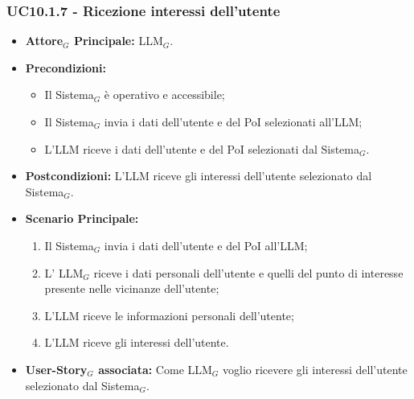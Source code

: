 \documentclass[10pt]{article}
\begin{document}
\begin{justify}
\subsubsection{\textbf{UC10.1.7 - Ricezione interessi dell'utente}}
\begin{itemize}
    \item \textbf{Attore$_G$ Principale:} LLM$_G$.
    \item \textbf{Precondizioni:} 
        \begin{itemize}
          \item Il Sistema$_G$ è operativo e accessibile;
          \item Il Sistema$_G$ invia i dati dell'utente e del PoI selezionati all'LLM;
            \item L'LLM riceve i dati dell'utente e del PoI selezionati dal Sistema$_G$.
        \end{itemize}
      \item \textbf{Postcondizioni:} L'LLM riceve gli interessi dell'utente selezionato dal Sistema$_G$.
    \item \textbf{Scenario Principale:} 
        \begin{enumerate}
          \item Il Sistema$_G$ invia i dati dell'utente e del PoI all'LLM;
        \item L' LLM$_G$ riceve i dati personali dell'utente e quelli del punto di interesse presente nelle vicinanze dell'utente;
          \item L'LLM riceve le informazioni personali dell'utente;
          \item L'LLM riceve gli interessi dell'utente.
        \end{enumerate}
      \item \textbf{User-Story$_G$ associata:} Come LLM$_G$ voglio ricevere gli interessi dell'utente selezionato dal Sistema$_G$.
\end{itemize}

\end{justify}
\end{document}
